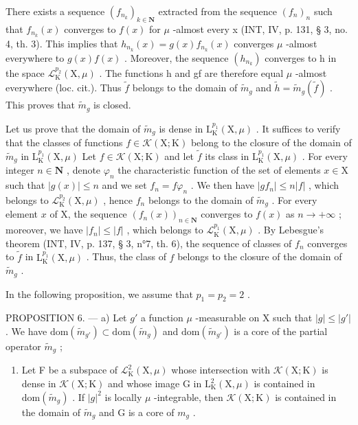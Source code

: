 There exists a sequence \((f_{n_{k}})_{k\in\mathbf{N}}\) extracted from the sequence \((f_{n})_{n}\) such that \(f_{n_{k}}(x)\) converges to \(f(x)\) for \(\mu\) -almost every x (INT, IV, p. 131, § 3, no. 4, th. 3). This implies that \(h_{n_{k}}(x)=g(x)f_{n_{k}}(x)\) converges \(\mu\) -almost everywhere to \(g(x)f(x)\) . Moreover, the sequence \((h_{n_{k}})\) converges to h in the space \(\mathcal{L}_{\mathrm{K}}^{p_{2}}(\mathrm{X},\mu)\) . The functions h and gf are therefore equal \(\mu\) -almost everywhere (loc. cit.). Thus \(\widetilde{f}\) belongs to the domain of \(\widetilde{m}_{g}\) and \(\widetilde{h}=\widetilde{m}_{g}(\widetilde{f})\) . This proves that \(\widetilde{m}_{g}\) is closed.

Let us prove that the domain of \(\widetilde{m}_g\) is dense in \(\mathrm{L}_{\mathrm{K}}^{p_1}(\mathrm{X},\mu)\) . It suffices to verify that the classes of functions \(f\in \mathcal{K}(\mathrm{X};\mathrm{K})\) belong to the closure of the domain of \(\widetilde{m}_g\) in \(\mathrm{L}_{\mathrm{K}}^{p_1}(\mathrm{X},\mu)\) Let \(f\in \mathcal{K}(\mathrm{X};\mathrm{K})\) and let \(\widetilde{f}\) its class in \(\mathrm{L}_{\mathrm{K}}^{p_1}(\mathrm{X},\mu)\) . For every integer \(n\in \mathbf{N}\) , denote \(\varphi_{n}\) the characteristic function of the set of elements \(x\in \mathrm{X}\) such that \(|g(x)|\leqslant n\) and we set \(f_{n} = f\varphi_{n}\) . We then have \(|gf_n|\leqslant n|f|\) , which belongs to \(\mathcal{L}_{\mathrm{K}}^{p_2}(\mathrm{X},\mu)\) , hence \(f_{n}\) belongs to the domain of \(\widetilde{m}_g\) . For every element \(x\) of X, the sequence \((f_n(x))_{n\in \mathbf{N}}\) converges to \(f(x)\) as \(n\to +\infty\) ; moreover, we have \(|f_n|\leqslant |f|\) , which belongs to \(\mathcal{L}_{\mathrm{K}}^{p_1}(\mathrm{X},\mu)\) . By Lebesgue's theorem (INT, IV, p. 137, § 3, n°7, th. 6), the sequence of classes of \(f_{n}\) converges to \(\widetilde{f}\) in \(\mathrm{L}_{\mathrm{K}}^{p_1}(\mathrm{X},\mu)\) . Thus, the class of \(f\) belongs to the closure of the domain of \(\widetilde{m}_g\) .

In the following proposition, we assume that \(p_1 = p_2 = 2\) .

PROPOSITION 6. --- a) Let \(g'\) a function \(\mu\) -measurable on X such that \(|g|\leqslant |g'|\) . We have \(\mathrm{dom}(\widetilde{m}_{g'})\subset\mathrm{dom}(\widetilde{m}_{g})\) and \(\mathrm{dom}(\widetilde{m}_{g'})\) is a core of the partial operator \(\widetilde{m}_{g}\) ;

\begin{enumerate}
\def\labelenumi{\alph{enumi})}
\setcounter{enumi}{1}
\tightlist
\item
  Let F be a subspace of \(\mathcal{L}_{\mathrm{K}}^{2}(\mathrm{X},\mu)\) whose intersection with \(\mathcal{K}(\mathrm{X};\mathrm{K})\) is dense in \(\mathcal{K}(\mathrm{X};\mathrm{K})\) and whose image G in \(\mathrm{L}_{\mathrm{K}}^{2}(\mathrm{X},\mu)\) is contained in \(\mathrm{dom}(\widetilde{m}_g)\) . If \(|g|^2\) is locally \(\mu\) -integrable, then \(\mathcal{K}(\mathrm{X};\mathrm{K})\) is contained in the domain of \(\widetilde{m}_g\) and G is a core of \(m_g\) .
\end{enumerate}


